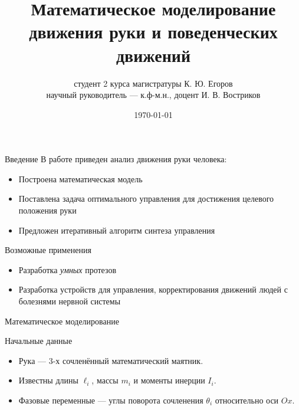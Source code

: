 \documentclass[16pt]{beamer}
\title[Конференция <<Ломоносовские чтения 2023>>]
        {Математическое моделирование движения руки и поведенческих движений}
\author[К. Ю. Егоров]
        {студент 2 курса магистратуры К. Ю. Егоров\\
        научный руководитель --- к.ф-м.н., доцент И. В. Востриков}
\institute{Кафедра системного анализа\\ ВМК МГУ}
\date{\today}
\begin{document}
    \begin{frame}
        \titlepage
    \end{frame}

    \begin{frame}{Введение}
        В работе приведен анализ движения руки человека:
        \begin{itemize}
            \item Построена математическая модель
            \item Поставлена задача оптимального управления для достижения целевого положения руки
            \item Предложен итеративный алгоритм синтеза управления
        \end{itemize}
        \vfill
        \begin{block}{Возможные применения}
            \begin{itemize}
                \item Разработка \textit{умных} протезов
                \item Разработка устройств для управления, корректирования движений людей с болезнями нервной системы
            \end{itemize}
            
        \end{block}
    \end{frame}

    \begin{frame}{Математическое моделирование}
        \begin{block}{Начальные данные}
            \begin{itemize}
                \item Рука --- 3-х сочленённый математический маятник.
                \item Известны длины $\ell_i$, массы $m_i$ и моменты инерции $I_i$.
                \item Фазовые переменные --- углы поворота сочленения $\theta_i$ относительно оси $Ox$. 
            \end{itemize}
        \end{block}
    \end{frame}
\end{document}
